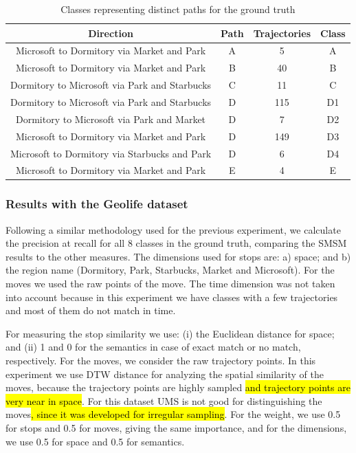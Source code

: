 \documentclass[12pt]{article}
\begin{document}
\begin{table}[ht!]
\scriptsize
  \centering
  \begin{tabular}{|c|c|c|c|}
  	\hline
 Direction & Path &  Trajectories & Class \\
  	\hline
Microsoft to Dormitory via Market and Park& A & 5 & A \\
Microsoft to Dormitory via Market and Park& B & 40&B \\
Dormitory to Microsoft via Park and Starbucks& C & 11&C \\
Dormitory to Microsoft via Park and Starbucks& D & 115&D1 \\
Dormitory to Microsoft via Park and Market& D & 7&D2 \\
Microsoft to Dormitory via Market and Park& D & 149&D3 \\
Microsoft to Dormitory via Starbucks and Park& D & 6&D4 \\
Microsoft to Dormitory via Market and Park& E & 4& E \\
    \hline
  \end{tabular}
  \caption{Classes representing distinct paths for the ground truth}
  \label{tab:geolife_dataset}
\end{table}

\subsubsection{Results with the Geolife dataset}

Following a similar methodology used for the previous experiment, we calculate the precision at recall for all 8 classes in the ground truth, comparing the SMSM results to the other measures. The dimensions used for stops are: a) space; and b) the region name (Dormitory, Park, Starbucks, Market and Microsoft). For the moves we used the raw points of the move. The time dimension was not taken into account because in this experiment we have classes with a few trajectories and most of them do not match in time.

For measuring the stop similarity we use: (i) the Euclidean distance for space; and (ii) 1 and 0 for the semantics in case of exact match or no match, respectively. For the moves,  we consider the raw trajectory points. In this experiment we use DTW distance for analyzing the spatial similarity of the moves, because the trajectory points are highly sampled \hl{and trajectory points are very near in space}. %
For this dataset UMS is not good for distinguishing the moves\hl{, since it was developed for irregular sampling}. For the weight, we use 0.5 for stops and 0.5 for moves, giving the same importance, and for the dimensions, we use 0.5 for space and 0.5 for semantics.
\end{document}
